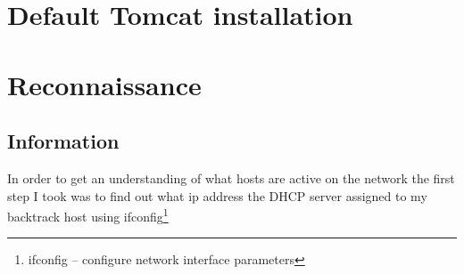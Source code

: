 \documentclass{article}
\begin{document}
\section{Default Tomcat installation}


\newpage
\section{Reconnaissance}
\subsection{Information}

In order to get an understanding of what hosts are active on the network the first step 
I took was to find out what ip address the DHCP server assigned to my backtrack host using 
ifconfig\footnote{\label{ifconfig}ifconfig -- configure network interface parameters} 
\end{document}
